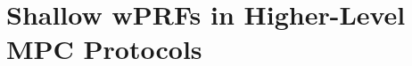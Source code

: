 \documentclass[journal=tosc,submission]{iacrtrans}
\theoremstyle{theorem}
\newcommand\class{\ensuremath{\mathcal{C}}\xspace}
\newcommand\msk{\ensuremath{\mathsf{msk}}\xspace}
\newcommand\KeyGen{\ensuremath{\mathsf{KeyGen}}\xspace}
\newcommand\Eval{\ensuremath{\mathsf{Eval}}\xspace}
\newcommand\N{\mathbb{N}}
\newcommand\cb[1]{\textcolor{red!80}{\textbf{Christina:} #1}}
\newcommand\gc[1]{\textcolor{olive!80}{\textbf{Geoffroy:} #1}}
\begin{document}





\section{Shallow wPRFs in Higher-Level MPC Protocols}
\label{sec:applications}

\end{document}
